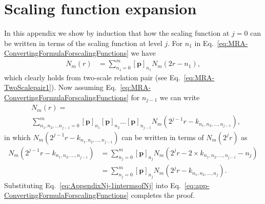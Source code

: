 \documentclass[review,authoryear,3p]{elsarticle}
\begin{document}
\section{Scaling function expansion}\label{ap:Induction}  
In this appendix we show by induction that how the scaling function at $j=0$ can be written in terms of the scaling function at level $j$. For $n_1$ in  Eq.~\eqref{eq:MRA-ConvertingFormulaForscalingFunctions} we have
\begin{align}
 N_{m}\left(r\right)&=\sum_{n_1=0}^{m} \left[\mathbf p\right]_{n_1} N_{m}\left(2r-n_1\right) \label{eq:App-TwoScalepair1},
  \end{align}
which clearly holds from two-scale relation pair (see Eq.~\eqref{eq:MRA-TwoScalepair1}). Now assuming Eq.~\eqref{eq:MRA-ConvertingFormulaForscalingFunctions} for $n_{j-1}$ we can write 
\begin{align}\label{eq:app-ConvertingFormulaForscalingFunctions}
 &N_m(r)=\nonumber \\
&\sum_{n_1,n_2, \dots n_{j-1}=0}^{m}\left[\mathbf p\right]_{n_1} \left[\mathbf p\right]_{n_2}\dots \left[\mathbf p\right]_{n_{j-1}}N_m(2^{j-1}r-k_{n_1,n_2, \dots, n_{j-1}}),
\end{align}
in which $N_m(2^{j-1}r-k_{n_1,n_2, \dots, n_{j-1}})$ can be written in terms of $N_m(2^{j}r)$ as
\begin{align}\label{eq:AppendixNj-1intermsofNj}
 N_m(2^{j-1}r-k_{n_1,n_2, \dots, n_{j-1}})&=\sum_{n_j=0}^m \left[\mathbf p\right]_{n_j}N_m(2^jr-2\times k_{n_1,n_2, \dots, n_{j-1}}-n_j)\nonumber \\
&=\sum_{n_j=0}^m \left[\mathbf p\right]_{n_j}N_m(2^jr- k_{n_1,n_2, \dots, n_{j}}).
\end{align}
Substituting Eq.~\eqref{eq:AppendixNj-1intermsofNj} into Eq.~\eqref{eq:app-ConvertingFormulaForscalingFunctions} completes the proof. 
\end{document}
